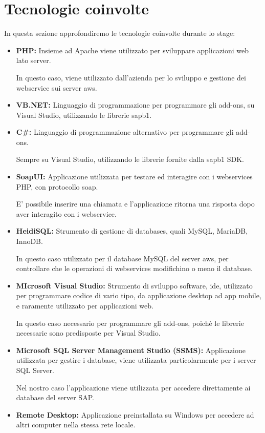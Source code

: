 \section{Tecnologie coinvolte}
In questa sezione approfondiremo le tecnologie coinvolte durante lo stage:
\begin{itemize}
    \item {\textbf{PHP:}} Insieme ad Apache viene utilizzato per sviluppare applicazioni web lato server.
	
	In questo caso, viene utilizzato dall'azienda per lo sviluppo e gestione dei webservice sui server \gls{aws}.
	\item {\textbf{VB.NET:}} Linguaggio di programmazione per programmare gli add-ons, su Visual Studio, utilizzando le librerie \gls{sapb1}.
	\item {\textbf{C\#:}} Linguaggio di programmazione alternativo per programmare gli add-ons.
	
	Sempre su Visual Studio, utilizzando le librerie fornite dalla \gls{sapb1} SDK.
    \item {\textbf{SoapUI:}} Applicazione utilizzata per testare ed interagire con i webservices PHP, con protocollo \gls{soap}.
	
	E' possibile inserire una chiamata e l'applicazione ritorna una risposta dopo aver interagito con i webservice.
    \item {\textbf{HeidiSQL:}} Strumento di gestione di databases, quali MySQL, MariaDB, InnoDB.
	
	In questo caso utilizzato per il database MySQL del server \gls{aws}, per controllare che le operazioni di webservices modifichino o meno il database.
    \item {\textbf{MIcrosoft Visual Studio:}} Strumento di sviluppo software, \gls{ide}, utilizzato per programmare codice di vario tipo, da applicazione desktop ad app mobile, e raramente utilizzato per applicazioni web.
	
	In questo caso necessario per programmare gli add-ons, poichè le librerie necessarie sono predisposte per Visual Studio.
	\item {\textbf{Microsoft SQL Server Management Studio (SSMS):}} Applicazione utilizzata per gestire i database, viene utilizzata particolarmente per i server SQL Server.
	
	Nel nostro caso l'applicazione viene utilizzata per accedere direttamente ai database del server SAP.
	\item {\textbf{Remote Desktop:}} Applicazione preinstallata su Windows per accedere ad altri computer nella stessa rete locale.
	

\end{itemize}
